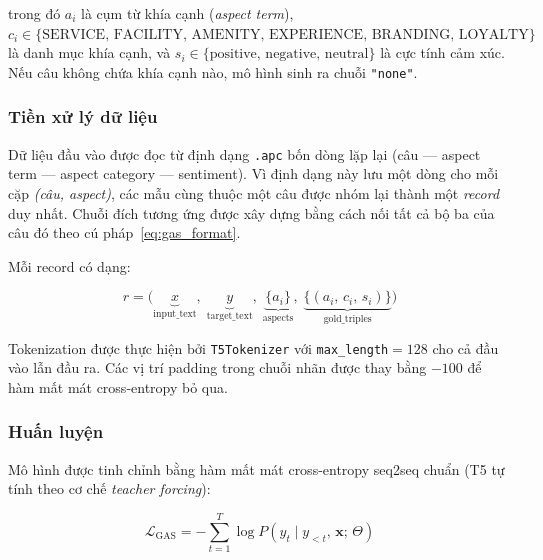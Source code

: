 \noindent trong đó $a_i$ là cụm từ khía cạnh (\textit{aspect term}),
$c_i \in \{\text{SERVICE, FACILITY, AMENITY, EXPERIENCE, BRANDING,
LOYALTY}\}$ là danh mục khía cạnh, và
$s_i \in \{\text{positive, negative, neutral}\}$ là cực tính cảm xúc.
Nếu câu không chứa khía cạnh nào, mô hình sinh ra chuỗi
\texttt{"none"}.

\subsubsection{Tiền xử lý dữ liệu}
\label{subsubsec:gas_data}

Dữ liệu đầu vào được đọc từ định dạng \texttt{.apc} bốn dòng lặp lại
(câu — aspect term — aspect category — sentiment).
Vì định dạng này lưu một dòng cho mỗi cặp \textit{(câu, aspect)},
các mẫu cùng thuộc một câu được nhóm lại thành một
\textit{record} duy nhất.  Chuỗi đích tương ứng được xây dựng bằng
cách nối tất cả bộ ba của câu đó theo cú pháp~\eqref{eq:gas_format}.

Mỗi record có dạng:

\begin{equation}
  r = \bigl(\underbrace{x}_{\text{input\_text}},\;
            \underbrace{y}_{\text{target\_text}},\;
            \underbrace{\{a_i\}}_{\text{aspects}},\;
            \underbrace{\{(a_i,\,c_i,\,s_i)\}}_{\text{gold\_triples}}
      \bigr)
  \label{eq:gas_record}
\end{equation}

Tokenization được thực hiện bởi \texttt{T5Tokenizer} với
\texttt{max\_length}$= 128$ cho cả đầu vào lẫn đầu ra.  Các vị trí
padding trong chuỗi nhãn được thay bằng $-100$ để hàm mất mát
cross-entropy bỏ qua.

\subsubsection{Huấn luyện}
\label{subsubsec:gas_train}

Mô hình được tinh chỉnh bằng hàm mất mát cross-entropy seq2seq chuẩn
(T5 tự tính theo cơ chế \textit{teacher forcing}):

\begin{equation}
  \mathcal{L}_{\text{GAS}} =
    -\sum_{t=1}^{T} \log P\!\left(y_t \mid y_{<t},\, \mathbf{x};\,
    \Theta\right)
  \label{eq:gas_loss}
\end{equation}

